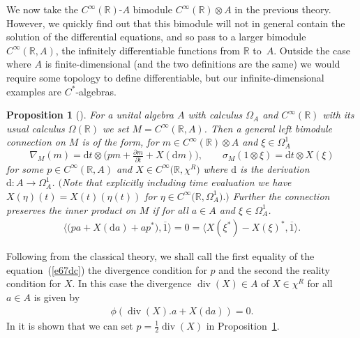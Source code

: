 \documentclass[10pt,a4paper]{amsart}
\numberwithin{equation}{section}
\newtheorem{Proposition}[Theorem]{Proposition}
 { \theoremstyle{definition}
\newtheorem{Definition}[Theorem]{Definition}
\newtheorem{Note}[Theorem]{Note}
\newtheorem{Example}[Theorem]{Example}
\newtheorem{Remark}[Theorem]{Remark} }
\newcommand{\extd}{\mathrm{d}}
\newcommand{\tens}{\mathop{\otimes}}
\newcommand{\R}{\mathbb{R}}
\newcommand{\<}{\langle}
\renewcommand{\>}{\rangle}
\begin{document}
We now take the $ C^{\infty}(\R) $-$ A $ bimodule $ C^{\infty}(\R) \tens A $ in the previous theory. However, we quickly find out that this bimodule will not in general contain the solution of the differential equations, and so pass to a larger bimodule $ C^{\infty}(\R, A) $, the infinitely differentiable functions from $ \R $ to~$ A $. Outside the case where $ A $ is finite-dimensional (and the two definitions are the same) we would require some topology to define differentiable, but our infinite-dimensional examples are $ C^{*} $-algebras.
\begin{Proposition}[\cite{Bgeo}] \label{prido}
	For a unital algebra $A$ with calculus $\Omega_A$ and $C^\infty(\R)$ with its usual calculus $\Omega(\R)$ we set $M=C^{\infty}(\R, A) $. Then a general left bimodule connection on $M$ is of the form, for $m\in C^\infty(\R)\tens A$ and $\xi\in\Omega^1_A$
	\[
	\nabla_M(m)=\extd t\tens \big(pm + \tfrac{\partial m}{\partial t} +X(\extd m)\big),\qquad \sigma_M(1\tens\xi)=\extd t\tens X(\xi)
	\]
	for some $p\in C^{\infty}(\R, A)$ and $X\in C^{\infty}\big(\R, \chi ^R\big)$ where $ \extd$ is the derivation $ \extd\colon A\rightarrow \Omega_{A}^{1} $. $\big($Note that explicitly including time evaluation we have
	$X(\eta)(t)=X(t)(\eta(t))$ for $\eta\in C^{\infty}\big(\R, \Omega^1_A\big).\big)$ Further the connection preserves the inner product on $M$ if for all $a\in A$ and $\xi\in\Omega^1_A$.
	\begin{gather}\label{e67dc}
			\<\big(pa+X(\extd a)+ap^*
		\big),\overline{1}\>=0 =\<X(\xi^*)-X(\xi)^*,\overline{1}\>.
	\end{gather}
\end{Proposition}

Following from the classical theory, we shall call the first equality of the equation~(\ref{e67dc}) the divergence condition for $p$ and the second the reality condition for $X$. In this case the divergence $ \operatorname{div} (X) \in A $ of $ X \in \chi^{R} $ for all $ a \in A $ is given by
\begin{align*}
\phi (\operatorname{div} (X).a+X(\extd a))=0.
\end{align*}
In \cite{Bgeo} it is shown that we can set $ p= \frac{1}{2} \operatorname{div} (X) $ in Proposition~\ref{prido}.
\end{document}
